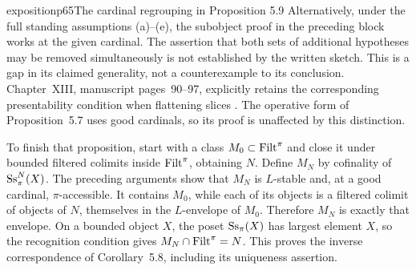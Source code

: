 \begin{dcomment}{exposition}{p65}{The cardinal regrouping in Proposition 5.9}
Alternatively, under the full standing assumptions (a)--(e), the subobject proof in the preceding block works at the given cardinal. The assertion that both sets of additional hypotheses may be removed simultaneously is not established by the written sketch. This is a gap in its claimed generality, not a counterexample to its conclusion. Chapter~XIII, manuscript pages~90--97, explicitly retains the corresponding presentability condition when flattening slices \citep{Grothendieck1990XIII}. The operative form of Proposition~5.7 uses good cardinals, so its proof is unaffected by this distinction.

To finish that proposition, start with a class $M_0\subset\mathrm{Filt}^\pi$ and close it under bounded filtered colimits inside $\mathrm{Filt}^\pi$, obtaining $N$. Define $M_N$ by cofinality of $\mathrm{Ss}_\pi^N(X)$. The preceding arguments show that $M_N$ is $L$-stable and, at a good cardinal, $\pi$-accessible. It contains $M_0$, while each of its objects is a filtered colimit of objects of $N$, themselves in the $L$-envelope of $M_0$. Therefore $M_N$ is exactly that envelope. On a bounded object $X$, the poset $\mathrm{Ss}_\pi(X)$ has largest element $X$, so the recognition condition gives $M_N\cap\mathrm{Filt}^\pi=N$. This proves the inverse correspondence of Corollary~5.8, including its uniqueness assertion.
\end{dcomment}


